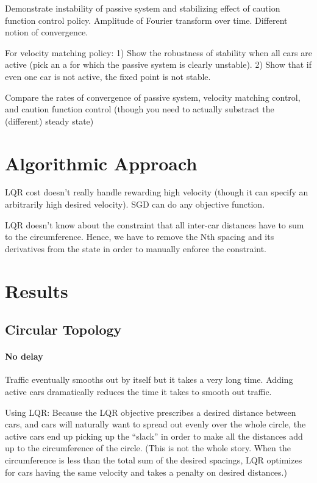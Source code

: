 \documentclass[10pt,twocolumn]{article}
\begin{document}
Demonstrate instability of passive system and stabilizing effect of caution function control policy. Amplitude of Fourier transform over time. Different notion of convergence.

For velocity matching policy: 1) Show the robustness of stability when all cars are active (pick an a for which the passive system is clearly unstable). 2) Show that if even one car is not active, the fixed point is not stable.

Compare the rates of convergence of passive system, velocity matching control, and caution function control (though you need to actually substract the (different) steady state)

\section{Algorithmic Approach}

LQR cost doesn't really handle rewarding high velocity (though it can specify an arbitrarily high desired velocity). SGD can do any objective function.

LQR doesn't know about the constraint that all inter-car distances have to sum to the circumference. Hence, we have to remove the Nth spacing and its derivatives from the state in order to manually enforce the constraint.

\section{Results}

\subsection{Circular Topology}

\paragraph{No delay} Traffic eventually smooths out by itself but it takes a very long time. Adding active cars dramatically reduces the time it takes to smooth out traffic. 

Using LQR: Because the LQR objective prescribes a desired distance between cars, and cars will naturally want to spread out evenly over the whole circle, the active cars end up picking up the ``slack'' in order to make all the distances add up to the circumference of the circle. (This is not the whole story. When the circumference is less than the total sum of the desired spacings, LQR optimizes for cars having the same velocity and takes a penalty on desired distances.)
\end{document}
